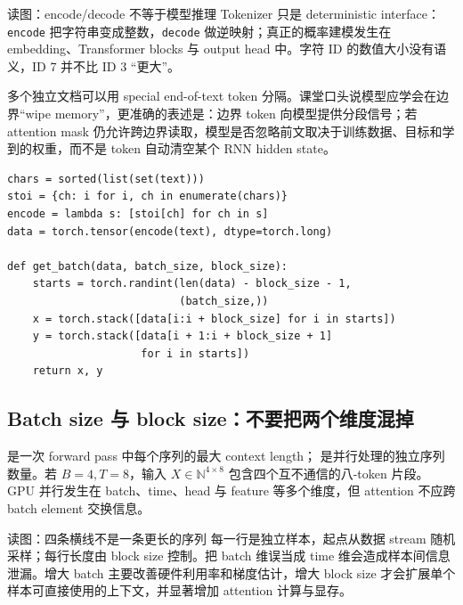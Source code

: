 \begin{knowledgebox}{读图：encode/decode 不等于模型推理}
Tokenizer 只是 deterministic interface：\texttt{encode} 把字符串变成整数，\texttt{decode} 做逆映射；真正的概率建模发生在 embedding、Transformer blocks 与 output head 中。字符 ID 的数值大小没有语义，ID 7 并不比 ID 3 “更大”。
\end{knowledgebox}


多个独立文档可以用 special end-of-text token 分隔。课堂口头说模型应学会在边界“wipe memory”，更准确的表述是：边界 token 向模型提供分段信号；若 attention mask 仍允许跨边界读取，模型是否忽略前文取决于训练数据、目标和学到的权重，而不是 token 自动清空某个 RNN hidden state。

\begin{lstlisting}[caption={Tiny Shakespeare 的字符编码与 shifted batch 构造。}]
chars = sorted(list(set(text)))
stoi = {ch: i for i, ch in enumerate(chars)}
encode = lambda s: [stoi[ch] for ch in s]
data = torch.tensor(encode(text), dtype=torch.long)

def get_batch(data, batch_size, block_size):
    starts = torch.randint(len(data) - block_size - 1,
                           (batch_size,))
    x = torch.stack([data[i:i + block_size] for i in starts])
    y = torch.stack([data[i + 1:i + block_size + 1]
                     for i in starts])
    return x, y
\end{lstlisting}

\subsection{Batch size 与 block size：不要把两个维度混掉}

 是一次 forward pass 中每个序列的最大 context length； 是并行处理的独立序列数量。若 $B=4,T=8$，输入 $X\in\mathbb N^{4\times8}$ 包含四个互不通信的八-token 片段。GPU 并行发生在 batch、time、head 与 feature 等多个维度，但 attention 不应跨 batch element 交换信息。


\begin{knowledgebox}{读图：四条横线不是一条更长的序列}
每一行是独立样本，起点从数据 stream 随机采样；每行长度由 block size 控制。把 batch 维误当成 time 维会造成样本间信息泄漏。增大 batch 主要改善硬件利用率和梯度估计，增大 block size 才会扩展单个样本可直接使用的上下文，并显著增加 attention 计算与显存。
\end{knowledgebox}

